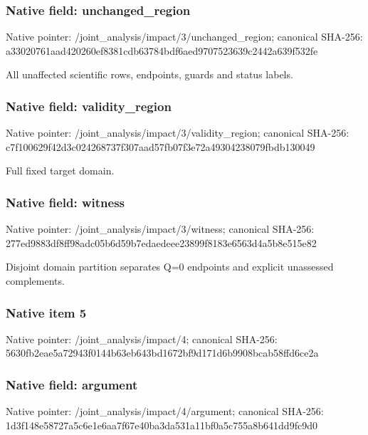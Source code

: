 \documentclass[10pt,a4paper]{article}
\begin{document}
\subsubsection{Native field: unchanged\_\allowbreak{}region}
Native pointer: /joint\_\allowbreak{}analysis/impact/3/unchanged\_\allowbreak{}region; canonical SHA-256: a33020761aad420260ef8381cdb63784bdf6aed9707523639c2442a639f532fe

\begingroup\raggedright\sloppy All unaffected scientific rows,\allowbreak{} endpoints,\allowbreak{} guards and status labels.\par\endgroup

\subsubsection{Native field: validity\_\allowbreak{}region}
Native pointer: /joint\_\allowbreak{}analysis/impact/3/validity\_\allowbreak{}region; canonical SHA-256: c7f100629f42d3c024268737f307aad57fb07f3e72a49304238079fbdb130049

\begingroup\raggedright\sloppy Full fixed target domain.\par\endgroup

\subsubsection{Native field: witness}
Native pointer: /joint\_\allowbreak{}analysis/impact/3/witness; canonical SHA-256: 277ed9883df8ff98adc05b6d59b7edaedeee23899f8183e6563d4a5b8e515e82

\begingroup\raggedright\sloppy Disjoint domain partition separates Q=\allowbreak{}0 endpoints and explicit unassessed complements.\par\endgroup

\subsubsection{Native item 5}
Native pointer: /joint\_\allowbreak{}analysis/impact/4; canonical SHA-256: 5630fb2eae5a72943f0144b63eb643bd1672bf9d171d6b9908bcab58ffd6ce2a

\subsubsection{Native field: argument}
Native pointer: /joint\_\allowbreak{}analysis/impact/4/argument; canonical SHA-256: 1d3f148e58727a5c6e1e6aa7f67e40ba3da531a11bf0a5c755a8b641dd9fc9d0
\end{document}
